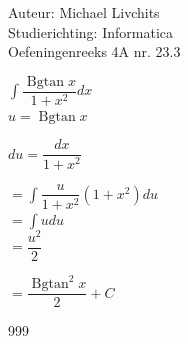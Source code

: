 \documentclass[a4paper]{article}
\newcommand{\Bgtan}{\operatorname{Bgtan}}
\begin{document}
  
\noindent \large Auteur: Michael Livchits \\
\noindent \large Studierichting: Informatica\\
\noindent \large Oefeningenreeks 4A nr. 23.3\\

\medskip

\normalsize

$\displaystyle\int\dfrac{\Bgtan x}{1+x^2}dx$\\

$u = \Bgtan x$

$du = \dfrac{dx}{1+x^2}$

$= \displaystyle\int\dfrac{u}{1+x^2}(1+x^2)du$\\

$= \displaystyle\int udu$\\

$= \dfrac{u^2}{2}$

$= \dfrac{\Bgtan^2x}{2} + C$

\begin{thebibliography}{999}
\end{thebibliography}
\end{document}
